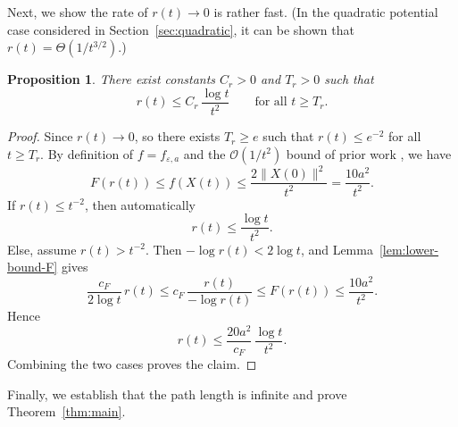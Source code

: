 \documentclass{article}
\newtheorem{proposition}[theorem]{Proposition}
\theoremstyle{remark}
\begin{document}



Next, we show the rate of $r(t)\rightarrow 0$ is rather fast.
(In the quadratic potential case considered in Section~\ref{sec:quadratic}, it can be shown that $r(t)=\Theta(1/t^{3/2})$.)

\begin{proposition}\label{prop:radial-bound}
There exist constants $C_r>0$ and $T_r>0$ such that
\[
  r(t)\le C_r\,\frac{\log t}{t^2}
  \qquad\text{for all }t\ge T_r.
\]
\end{proposition}

\begin{proof}
Since $r(t)\to0$, so there exists $T_r\ge e$ such that $r(t)\le e^{-2}$ for all $t\ge T_r$. By definition of $f=f_{\varepsilon,a}$ and the $\mathcal{O}(1/t^2)$ bound of prior work \cite[Theorem~3]{SuBoydCandes2016}, we have 
\[
  F(r(t))\le f(X(t))\le \frac{2\|X(0)\|^2}{t^2}= \frac{10a^2}{t^2}.
\]
If $r(t)\le t^{-2}$, then automatically
\[
  r(t)\le \frac{\log t}{t^2}.
\]
Else, assume $r(t)>t^{-2}$. Then $-\log r(t)<2\log t$, and Lemma~\ref{lem:lower-bound-F} gives
\[
  \frac{c_F}{2\log t}\,r(t)
  \le c_F\,\frac{r(t)}{-\log r(t)}
  \le F(r(t))
  \le \frac{10a^2}{t^2}.
\]
Hence
\[
  r(t)\le \frac{20a^2}{c_F}\,\frac{\log t}{t^2}.
\]
Combining the two cases proves the claim.
\end{proof}


Finally, we establish that the path length is infinite and prove Theorem~\ref{thm:main}.
\end{document}
